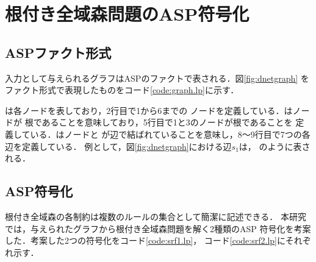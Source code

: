 \section{根付き全域森問題のASP符号化}\label{chap:encode}

\subsection{ASPファクト形式}
入力として与えられるグラフはASPのファクトで表される．図\ref{fig:dnetgraph}
をファクト形式で表現したものをコード\ref{code:graph.lp}に示す．



は各ノードを表しており，2行目で1から6までの
ノードを定義している．はノードが
根であることを意味しており，5行目で1と3のノードが根であることを
定義している．はノードと
が辺で結ばれていることを意味し，8～9行目で7つの各辺を定義している．
例として，図\ref{fig:dnetgraph}における辺$s_{1}$は，
のように表される．

\subsection{ASP符号化}
根付き全域森の各制約は複数のルールの集合として簡潔に記述できる．
本研究では，与えられたグラフから根付き全域森問題を解く2種類のASP
符号化を考案した．考案した2つの符号化をコード\ref{code:srf1.lp}，
コード\ref{code:srf2.lp}にそれぞれ示す．





